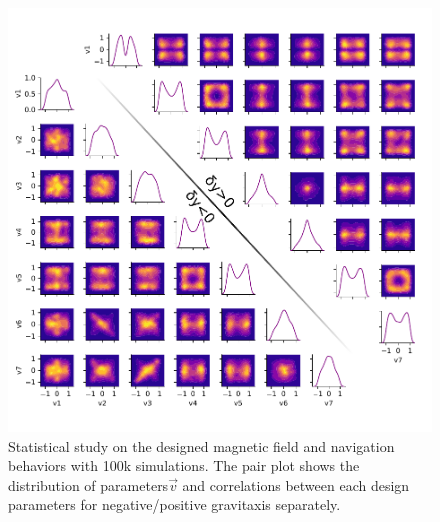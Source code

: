  
 \begin{figure}[p]
\centering
\includegraphics[width=16cm]{figures/5_4.pdf}
\caption{ Statistical study on the designed magnetic field and navigation behaviors with 100k simulations. The pair plot shows the distribution of parameters$\vec{v}$ and correlations between each design parameters for negative/positive gravitaxis separately.}
\label{fig:1}
\end{figure}
 
 
 
